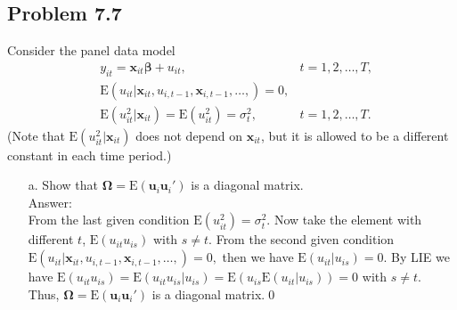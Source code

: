 \documentclass[10pt]{article}
\newcommand{\E}{\text{E}}
\begin{document}
\subsection*{Problem 7.7}
Consider the panel data model
\begin{align*}
    &y_{it}=\textbf{x}_{it}\pmb{\beta}+u_{it},  &t=1,2,\ldots,T, \\
    &\E(u_{it}|\textbf{x}_{it},u_{i,t-1},\textbf{x}_{i,t-1},\ldots,)=0, &\\
    &\E(u_{it}^2|\textbf{x}_{it})=\E(u_{it}^2)=\sigma_t^2, &t=1,2,\ldots,T.
\end{align*}
(Note that $\E(u_{it}^2|\textbf{x}_{it})$ does not depend on $\textbf{x}_{it}$, but it is allowed to be a different constant in each time period.)
\begin{enumerate}
\item[a.] Show that $\pmb{\Omega}= \E(\textbf{u}_i\textbf{u}_i')$ is a diagonal matrix.
\\ Answer: \\
From the last given condition $\E(u_{it}^2)=\sigma_t^2$. Now take the element with different $t$, $\E(u_{it}u_{is})$ with $s\neq t$. From the second given condition $\E(u_{it}|\textbf{x}_{it},u_{i,t-1},\textbf{x}_{i,t-1},\ldots,)=0,$ then we have $\E(u_{it}|u_{is})=0.$ By LIE we have $\E(u_{it}u_{is})=\E(u_{it}u_{is}|u_{is})=\E(u_{is}\E(u_{it}|u_{is}))=0$ with $s\neq t$. Thus, $\pmb{\Omega}= \E(\textbf{u}_i\textbf{u}_i')$ is a diagonal matrix.\qed


\end{enumerate}
\end{document}
